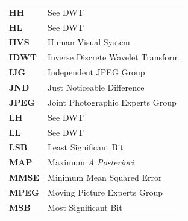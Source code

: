 \documentclass[12pt]{report}
\begin{document}
\begin{table}[!ht]
\begin{tabular}{p{3cm}l}
{\bf HH}        & See DWT \\
{\bf HL}        & See DWT \\
{\bf HVS}               & Human Visual System \\
{\bf IDWT}              & Inverse Discrete Wavelet Transform \\
{\bf IJG}       & Independent JPEG Group \\
{\bf JND}               & Just Noticeable Difference \\
{\bf JPEG}      & Joint Photographic Experts Group \\
{\bf LH}        & See DWT \\
{\bf LL}        & See DWT \\
{\bf LSB}       & Least Significant Bit \\
{\bf MAP}       & Maximum \emph{A Posteriori} \\
{\bf MMSE}      & Minimum Mean Squared Error \\
{\bf MPEG}      & Moving Picture Experts Group \\
{\bf MSB}       & Most Significant Bit \\
\end{tabular}
\end{table}
\end{document}
